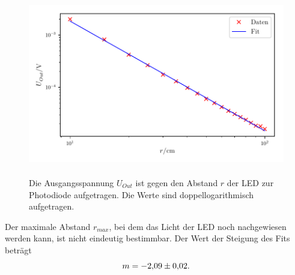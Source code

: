 \begin{figure}
    \centering
    \includegraphics[width=12cm, height=8cm]{build/plot4.pdf}
    \caption{Die Ausgangsspannung $U_{Out}$ ist gegen den Abstand $r$ der LED zur Photodiode aufgetragen.
    Die Werte sind doppellogarithmisch aufgetragen.}
    \label{fig:plot4}
\end{figure}

\noindent Der maximale Abstand $r_{max}$, bei dem das Licht der LED %
noch nachgewiesen werden kann, ist nicht eindeutig bestimmbar.
Der Wert der Steigung des Fits beträgt 
\begin{equation*}
m = \num{-2.09 \pm 0.02}. 
\end{equation*}
